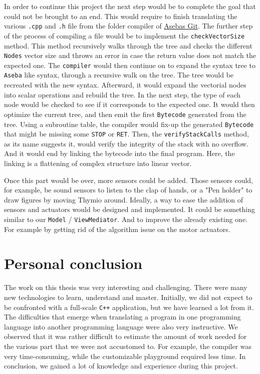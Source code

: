 \documentclass{scrreprt}
\begin{document}
In order to continue this project the next step would be to complete the goal that could not be brought to an end. This would require to finish translating the various \texttt{.cpp} and \texttt{.h} file from the folder compiler of \href{ https://github.com/aseba-community/aseba/tree/master/aseba/compiler}{Asebas Git}. 
The further step of the process of compiling a file would be to implement the \texttt{checkVectorSize} method. This method recursively walks through the tree and checks the different \texttt{Nodes} vector size and throws an error in case the return value does not match the expected one. 
The \texttt{compiler} would then continue on to expand the syntax tree to \texttt{Aseba} like syntax, through a recursive walk on the tree. The tree would be recreated with the new syntax. Afterward, it would expand the vectorial nodes into scalar operations and rebuild the tree. 
In the next step, the type of each node would be checked to see if it corresponds to the expected one. It would then optimize the current tree, and then emit the first \texttt{Bytecode} generated from the tree. 
Using a subroutine table, the compiler would fix-up the generated \texttt{Bytecode} that might be missing some \texttt{STOP} or \texttt{RET}. Then, the \texttt{verifyStackCalls} method, as its name suggests it, would verify the integrity of the stack with no overflow. 
And it would end by linking the bytecode into the final program. Here, the linking is a flattening of complex structure into linear vector.

Once this part would be over, more sensors could be added. Those sensors could, for example, be sound sensors to listen to the clap of hands, or a "Pen holder" to draw figures by moving Thymio around. 
Ideally, a way to ease the addition of sensors and actuators would be designed and implemented. It could be something similar to our \texttt{Model} / \texttt{ViewMediator}. And to improve the already existing one. For example by getting rid of the algorithm issue on the motor actuators.

\section{Personal conclusion}

The work on this thesis was very interesting and challenging. There were many new technologies to learn, understand and master. Initially, we did not expect to be confronted with a full-scale \texttt{C++} application, but we have learned a lot from it.
The difficulties that emerge when translating a program in one programming language into another programming language were also very instructive. We observed that it was rather difficult to estimate the amount of work needed for the various part that we were not accustomed to.
For example, the compiler was very time-consuming, while the customizable playground required less time. In conclusion, we gained a lot of knowledge and experience during this project.
\end{document}
